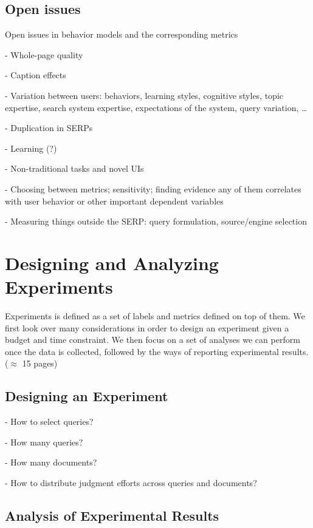 \documentclass[openany]{now} %
\begin{document}
\section{Open issues}

Open issues in behavior models and the corresponding metrics

- Whole-page quality

- Caption effects

- Variation between users: behaviors, learning styles, cognitive styles, topic expertise, search system expertise, expectations of the system, query variation, \dots

- Duplication in SERPs

- Learning (?)

- Non-traditional tasks and novel UIs

- Choosing between metrics; sensitivity; finding evidence any of them correlates with user behavior or other important dependent variables

- Measuring things outside the SERP: query formulation, source/engine selection

\chapter{Designing and Analyzing Experiments}
\label{c-experiment-design}

Experiments is defined as a set of labels and metrics defined on top of them. We first look over many considerations in order to design an experiment given a budget and time constraint. We then focus on a set of analyses we can perform once the data is collected, followed by the ways of reporting experimental results. (\ensuremath{\approx} 15 pages)

\section{Designing an Experiment}

- How to select queries?

- How many queries? \cite{Sakai:2014}

- How many documents? \cite{CarterettePFK09}

- How to distribute judgment efforts across queries and documents? \cite{CarterettePKAA09, YilmazR09}


\section{Analysis of Experimental Results}
\end{document}
